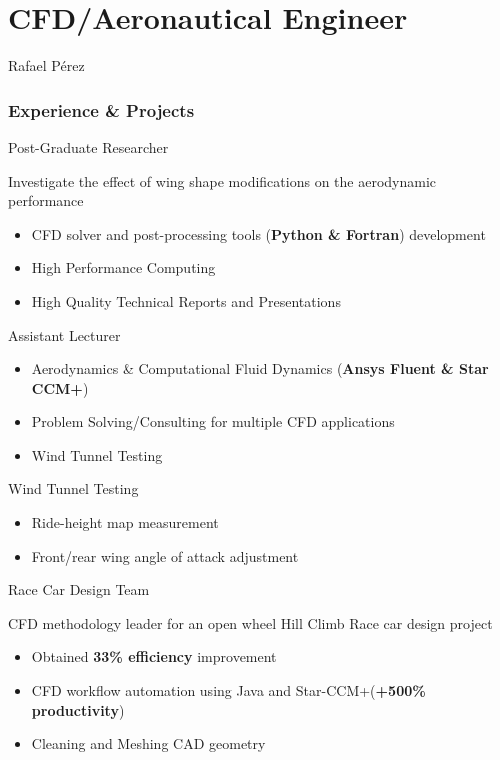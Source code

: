 \documentclass[fontsize=10pt]{tccv}
\begin{document}
\part{CFD/Aeronautical Engineer}{Rafael P\'erez}

\section{Experience \& Projects}
\begin{eventlist}
     {Post-Graduate Researcher}

Investigate the effect of wing shape modifications on
the aerodynamic performance
\begin{itemize}
	\itemsep -2pt
	\item CFD solver and post-processing tools (\textbf{Python \& Fortran}) development
	\item High Performance Computing
	\item High Quality Technical Reports and Presentations
\end{itemize}

	{Assistant Lecturer}
\begin{itemize}
	\itemsep -2pt
	\item Aerodynamics \& Computational Fluid Dynamics (\textbf{Ansys Fluent \& Star
	CCM+})
	\item Problem Solving/Consulting for multiple CFD applications
	\item Wind Tunnel Testing
\end{itemize}

     {Wind Tunnel Testing}
     \begin{itemize}
	\itemsep -2pt
     	\item Ride-height map measurement
     	\item Front/rear wing angle of attack adjustment
     \end{itemize}

     {Race Car Design Team}

CFD methodology leader for an open wheel Hill Climb Race car design project
     \begin{itemize}
	\itemsep -2pt
     	\item Obtained \textbf{33\% efficiency} improvement
     	\item CFD workflow automation using Java and Star-CCM+(\textbf{+500\% productivity})
	\item Cleaning and Meshing CAD geometry
     \end{itemize}


\end{eventlist}
\end{document}
